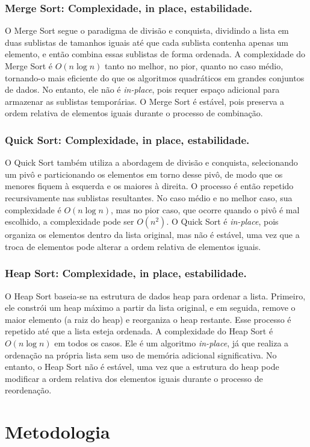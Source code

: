 \documentclass[a4paper,12pt]{article}
\begin{document}
\subsubsection{Merge Sort: Complexidade, in place, estabilidade.}
O Merge Sort segue o paradigma de divisão e conquista, dividindo a lista em duas sublistas de tamanhos iguais até que cada sublista contenha apenas um elemento, e então combina essas sublistas de forma ordenada. A complexidade do Merge Sort é \(O(n \log n)\) tanto no melhor, no pior, quanto no caso médio, tornando-o mais eficiente do que os algoritmos quadráticos em grandes conjuntos de dados. No entanto, ele não é \textit{in-place}, pois requer espaço adicional para armazenar as sublistas temporárias. O Merge Sort é estável, pois preserva a ordem relativa de elementos iguais durante o processo de combinação.
\subsubsection{Quick Sort: Complexidade, in place, estabilidade.}
O Quick Sort também utiliza a abordagem de divisão e conquista, selecionando um pivô e particionando os elementos em torno desse pivô, de modo que os menores fiquem à esquerda e os maiores à direita. O processo é então repetido recursivamente nas sublistas resultantes. No caso médio e no melhor caso, sua complexidade é \(O(n \log n)\), mas no pior caso, que ocorre quando o pivô é mal escolhido, a complexidade pode ser \(O(n^2)\). O Quick Sort é \textit{in-place}, pois organiza os elementos dentro da lista original, mas não é estável, uma vez que a troca de elementos pode alterar a ordem relativa de elementos iguais.
\subsubsection{Heap Sort: Complexidade, in place, estabilidade.}
O Heap Sort baseia-se na estrutura de dados heap para ordenar a lista. Primeiro, ele constrói um heap máximo a partir da lista original, e em seguida, remove o maior elemento (a raiz do heap) e reorganiza o heap restante. Esse processo é repetido até que a lista esteja ordenada. A complexidade do Heap Sort é \(O(n \log n)\) em todos os casos. Ele é um algoritmo \textit{in-place}, já que realiza a ordenação na própria lista sem uso de memória adicional significativa. No entanto, o Heap Sort não é estável, uma vez que a estrutura do heap pode modificar a ordem relativa dos elementos iguais durante o processo de reordenação.

\section{Metodologia}
\end{document}
